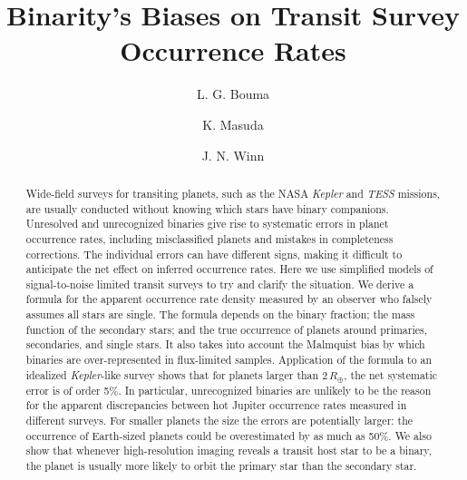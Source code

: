 \documentclass[12pt,modern]{aastex61}
\begin{document}
    
\title{ Binarity's Biases on Transit Survey Occurrence Rates }
%
%
\author[0000-0002-0514-5538]{L. G. Bouma}
\author[0000-0003-1298-9699]{K. Masuda}
\author[0000-0002-4265-047X]{J. N. Winn}
%
%
\begin{abstract}
%
Wide-field surveys for transiting planets, such as the NASA {\it
  Kepler} and {\it TESS} missions, are usually conducted without
knowing which stars have binary companions. Unresolved and
unrecognized binaries give rise to systematic errors in planet
occurrence rates, including misclassified planets and mistakes in
completeness corrections.  The individual errors can have different
signs, making it difficult to anticipate the net effect on inferred
occurrence rates. Here we use simplified models of signal-to-noise
limited transit surveys to try and clarify the situation. We derive a
formula for the apparent occurrence rate density measured by an
observer who falsely assumes all stars are single. The formula depends
on the binary fraction; the mass function of the secondary stars; and
the true occurrence of planets around primaries, secondaries, and
single stars. It also takes into account the Malmquist bias by which
binaries are over-represented in flux-limited samples. Application of
the formula to an idealized {\it Kepler}-like survey shows that for
planets larger than 2\,$R_\oplus$, the net systematic error is of
order 5\%.  In particular, unrecognized binaries are unlikely to be
the reason for the apparent discrepancies between hot Jupiter
occurrence rates measured in different surveys.  For smaller planets
the size the errors are potentially larger: the occurrence of
Earth-sized planets could be overestimated by as much as 50\%. We also
show that whenever high-resolution imaging reveals a transit host star
to be a binary, the planet is usually more likely to orbit the primary
star than the secondary star.
%
\end{abstract}
%
%
%

\end{document}
